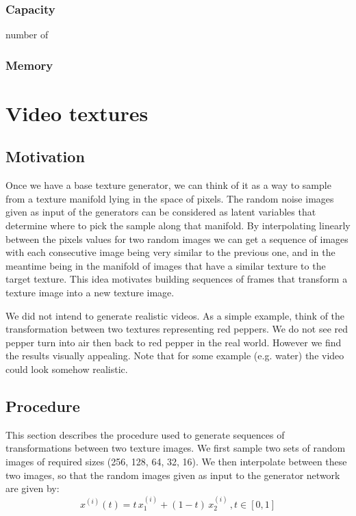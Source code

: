 \documentclass{article}
\begin{document}
\subsubsection{Capacity}

number of 

\subsubsection{Memory}

\section{Video textures}

\subsection{Motivation}
Once we have a base texture generator, we can think of it as a way to sample from a texture manifold lying in the space of pixels. The random noise images given as input of the generators can be considered as latent variables that determine where to pick the sample along that manifold. By interpolating linearly between the pixels values for two random images we can get a sequence of images with each consecutive image being very similar to the previous one, and in the meantime being in the manifold of images that have a similar texture to the target texture. This idea motivates building sequences of frames that transform a texture image into a new texture image.

We did not intend to generate realistic videos. As a simple example, think of the transformation between two textures representing red peppers. We do not see red pepper turn into air then back to red pepper in the real world. However we find the results visually appealing. Note that for some example (e.g. water) the video could look somehow realistic.

\subsection{Procedure}

This section describes the procedure used to generate sequences of transformations between two texture images. We first sample two sets of random images of required sizes (256, 128, 64, 32, 16). We then interpolate between these two images, so that the random images given as input to the generator network are given by:
$$x^{(i)}(t) = t \, x^{(i)}_1 + (1-t) \,  x^{(i)}_2 \, , t \in [0,1]$$
\end{document}
